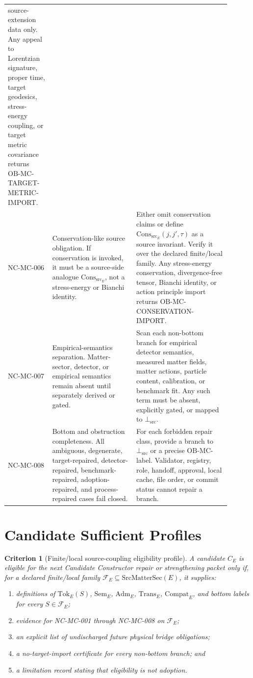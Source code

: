 \documentclass[11pt]{article}
\newcommand{\BottomSrc}{\bot_{\mathrm{src}}}
\newcommand{\SrcMatterSec}{\mathrm{SrcMatterSec}}
\newcommand{\Tok}{\mathrm{Tok}}
\newcommand{\Sem}{\mathrm{Sem}}
\newcommand{\Adm}{\mathrm{Adm}}
\newcommand{\Trans}{\mathrm{Trans}}
\newcommand{\Compat}{\mathrm{Compat}}
\newcommand{\ConsSrc}{\mathrm{Cons}_{\mathrm{src}}}
\newcommand{\OBMC}{\mathrm{OB}\mbox{-}\mathrm{MC}}
\newtheorem{criterion}{Criterion}
\begin{document}
\begin{longtable}{p{0.18\linewidth}p{0.34\linewidth}p{0.38\linewidth}}
source-extension data only. Any appeal to Lorentzian signature, proper time,
target geodesics, stress-energy coupling, or target metric covariance returns
\(\OBMC\)-TARGET-METRIC-IMPORT. \\
\addlinespace
NC-MC-006 &
Conservation-like source obligation. If conservation is invoked, it must be a
source-side analogue \(\ConsSrc_E\), not a stress-energy or Bianchi identity. &
Either omit conservation claims or define
\(\ConsSrc_E(j,j',\tau)\) as a source invariant. Verify it over the declared
finite/local family. Any stress-energy conservation, divergence-free tensor,
Bianchi identity, or action principle import returns
\(\OBMC\)-CONSERVATION-IMPORT. \\
\addlinespace
NC-MC-007 &
Empirical-semantics separation. Matter-sector, detector, or empirical
semantics remain absent until separately derived or gated. &
Scan each non-bottom branch for empirical detector semantics, measured matter
fields, matter actions, particle content, calibration, or benchmark fit. Any
such term must be absent, explicitly gated, or mapped to \(\BottomSrc\). \\
\addlinespace
NC-MC-008 &
Bottom and obstruction completeness. All ambiguous, degenerate, target-repaired,
detector-repaired, benchmark-repaired, adoption-repaired, and process-repaired
cases fail closed. &
For each forbidden repair class, provide a branch to \(\BottomSrc\) or a
precise \(\OBMC\)-label. Validator, registry, role, handoff, approval, local
cache, file order, or commit status cannot repair a branch. \\
\bottomrule
\end{longtable}

\section{Candidate Sufficient Profiles}

\begin{criterion}[Finite/local source-coupling eligibility profile]
A candidate \(C_E\) is eligible for the next Candidate Constructor repair or
strengthening packet only if, for a declared finite/local family
\(\mathcal{F}_E\subseteq\SrcMatterSec(E)\), it supplies:
\begin{enumerate}[leftmargin=*]
  \item definitions of \(\Tok_E(S)\), \(\Sem_E\), \(\Adm_E\), \(\Trans_E\),
  \(\Compat_E\), and bottom labels for every \(S\in\mathcal{F}_E\);
  \item evidence for NC-MC-001 through NC-MC-008 on \(\mathcal{F}_E\);
  \item an explicit list of undischarged future physical bridge obligations;
  \item a no-target-import certificate for every non-bottom branch; and
  \item a limitation record stating that eligibility is not adoption.
\end{enumerate}
\end{criterion}
\end{document}
